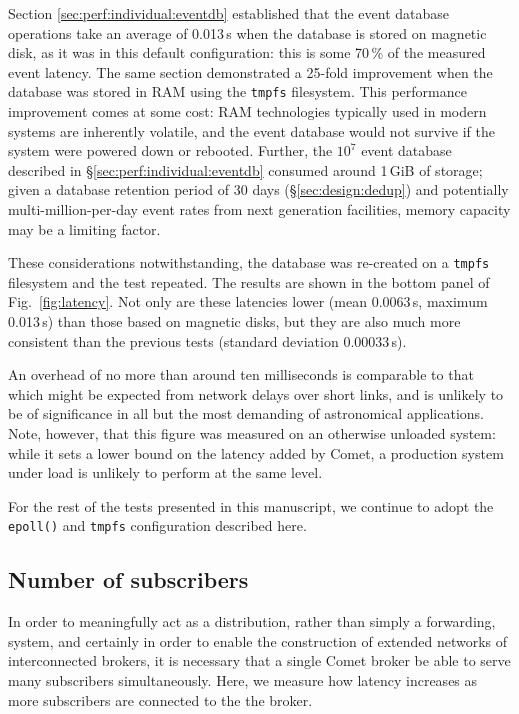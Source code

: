 \documentclass[5p,authoryear]{elsarticle}
\begin{document}
Section \ref{sec:perf:individual:eventdb} established that the event database
operations take an average of 0.013\,s when the database is stored on magnetic
disk, as it was in this default configuration: this is some 70\,\% of the
measured event latency. The same section demonstrated a 25-fold improvement
when the database was stored in RAM using the \texttt{tmpfs} filesystem. This
performance improvement comes at some cost: RAM technologies typically used in
modern systems are inherently volatile, and the event database would not
survive if the system were powered down or rebooted. Further, the $10^7$ event
database described in \S\ref{sec:perf:individual:eventdb} consumed around
1\,GiB of storage; given a database retention period of 30 days
(\S\ref{sec:design:dedup}) and potentially multi-million-per-day event rates
from next generation facilities, memory capacity may be a limiting factor.

These considerations notwithstanding, the database was re-created on a
\texttt{tmpfs} filesystem and the test repeated. The results are shown in the
bottom panel of Fig.~\ref{fig:latency}. Not only are these latencies lower
(mean 0.0063\,s, maximum 0.013\,s) than those based on magnetic disks, but
they are also much more consistent than the previous tests (standard deviation
0.00033\,s).

An overhead of no more than around ten milliseconds is comparable to that
which might be expected from network delays over short links, and is unlikely
to be of significance in all but the most demanding of astronomical
applications. Note, however, that this figure was measured on an otherwise
unloaded system: while it sets a lower bound on the latency added by Comet, a
production system under load is unlikely to perform at the same level.

For the rest of the tests presented in this manuscript, we continue to adopt
the \texttt{epoll()} and \texttt{tmpfs} configuration described here.

\subsection{Number of subscribers}

In order to meaningfully act as a distribution, rather than simply a
forwarding, system, and certainly in order to enable the construction of
extended networks of interconnected brokers, it is necessary that a single
Comet broker be able to serve many subscribers simultaneously. Here, we
measure how latency increases as more subscribers are connected to the the
broker.
\end{document}

